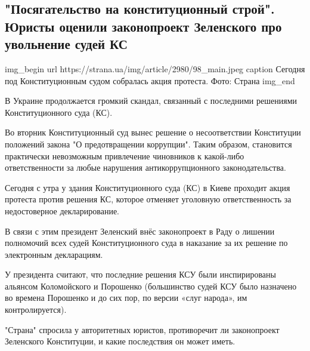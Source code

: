 
 
 

\subsection{"Посягательство на конституционный строй". Юристы оценили законопроект Зеленского про увольнение судей КС}
\label{sec:30_10_2020.news.ua.strana.1.KS_zelja}



\ifcmt
img_begin 
	url https://strana.ua/img/article/2980/98_main.jpeg
	caption Сегодня под Конституционным судом собралась акция протеста. Фото: Страна 
img_end
\fi

В Украине продолжается громкий скандал, связанный с последними решениями
Конституционного суда (КС). 

Во вторник Конституционный суд вынес решение о несоответствии Конституции
положений закона "О предотвращении коррупции". Таким образом, становится
практически невозможным привлечение чиновников к какой-либо
ответственности за любые нарушения антикоррупционного законодательства.
 
Сегодня с утра у здания Конституционного суда (КС) в Киеве проходит акция
протеста против решения КС, которое отменяет уголовную ответственность за
недостоверное декларирование.
 
В связи с этим президент Зеленский внёс законопроект в Раду о лишении
полномочий всех судей Конституционного суда в наказание за их решение по
электронным декларациям.
 
У президента считают, что последние решения КСУ были инспирированы
альянсом Коломойского и Порошенко (большинство судей КСУ было назначено во
времена Порошенко и до сих пор, по версии «слуг народа», им
контролируется).
 
"Страна" спросила у авторитетных юристов, противоречит ли законопроект
Зеленского Конституции, и какие последствия он может иметь.

